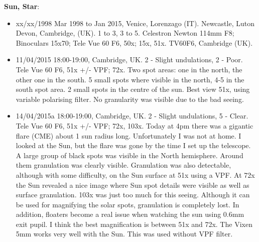 {\bf Sun, Star}:
\begin{itemize}
\item xx/xx/1998 Mar 1998 to Jan 2015, Venice, Lorenzago (IT). Newcastle, Luton Devon, Cambridge, (UK). 1 to 3, 3 to 5. Celestron Newton 114mm F8; Binoculars 15x70; Tele Vue 60 F6, 50x; 15x, 51x. TV60F6, Cambridge (UK).
\item 11/04/2015 18:00-19:00, Cambridge, UK. 2 - Slight undulations, 2 - Poor. Tele Vue 60 F6, 51x +/- VPF; 72x. Two spot areas: one in the north, the other one in the south. 5 small spots where visible in the north, 4-5 in the south spot area. 2 small spots in the centre of the sun. Best view 51x, using variable polarising filter. No granularity was visible due to the bad seeing.
\item 14/04/2015a 18:00-19:00, Cambridge, UK. 2 - Slight undulations, 5 - Clear. Tele Vue 60 F6, 51x +/- VPF; 72x, 103x. Today at 4pm there was a gigantic flare (CME) about 1 sun radius long. Unfortunately I was not at home. I looked at the Sun, but the flare was gone by the time I set up the telescope. A large group of black spots was visible in the North hemisphere. Around them granulation was clearly visible. Granulation was also detectable, although with some difficulty, on the Sun surface at 51x using a VPF. At 72x the Sun revealed a nice image where Sun spot details were visible as well as surface granulation. 103x was just too much for this seeing. Although it can be used for magnifying the solar spots, granulation is completely lost. In addition, floaters become a real issue when watching the sun using 0.6mm exit pupil. I think the best magnification is between 51x and 72x. The Vixen 5mm works very well with the Sun. This was used without VPF filter.

\end{itemize}
